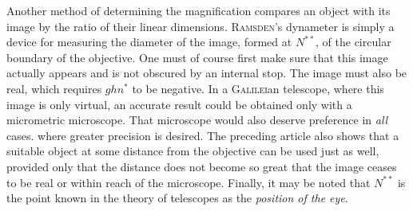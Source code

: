 Another method of determining the magnification compares an object with its image by the ratio of their linear dimensions. \textsc{Ramsden}'s dynameter is simply a device for measuring the diameter of the image, formed at $N^{**}$, of the circular boundary of the objective. One must of course first make sure that this image actually appears and is not obscured by an internal stop. The image must also be real, which requires $ghn^*$ to be negative. In a \textsc{Galilei}an telescope, where this image is only virtual, an accurate result could be obtained only with a micrometric microscope. That microscope would also deserve preference in \textit{all} cases. where greater precision is desired. The preceding article also shows that a suitable object at some distance from the objective can be used just as well, provided only that the distance does not become so great that the image ceases to be real or within reach of the microscope. Finally, it may be noted that $N^{**}$ is the point known in the theory of telescopes as the \textit{position of the eye}.

